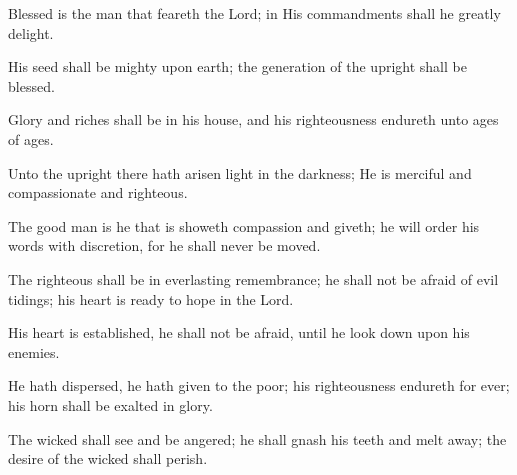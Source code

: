 Blessed is the man that feareth the Lord; in His commandments shall he greatly delight.

His seed shall be mighty upon earth; the generation of the upright shall be blessed.

Glory and riches shall be in his house, and his righteousness endureth unto ages of ages.

Unto the upright there hath arisen light in the darkness; He is merciful and compassionate and righteous.

The good man is he that is showeth compassion and giveth; he will order his words with discretion, for he shall never be moved.

The righteous shall be in everlasting remembrance; he shall not be afraid of evil tidings; his heart is ready to hope in the Lord.

His heart is established, he shall not be afraid, until he look down upon his enemies.

He hath dispersed, he hath given to the poor; his righteousness endureth for ever; his horn shall be exalted in glory.

The wicked shall see and be angered; he shall gnash his teeth and melt away; the desire of the wicked shall perish.
